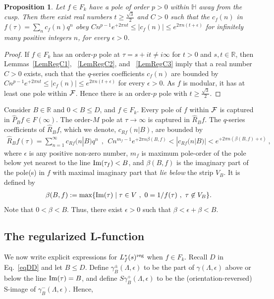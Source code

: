 \documentclass[11pt,a4paper]{article}
\newcommand{\g}{\gamma}
\newcommand{\e}{\epsilon}
\newcommand{\La}{\Lambda}
\newcommand{\Fu}{{\cal F}}
\newtheorem{prop}[thm]{Proposition}
\def\R{\mathbb{R}}
\newcommand{\HH}{{\mathbb H}}				%
\newcommand{\reg}{{\rm reg}}
\newcommand{\PF}{\widehat{P}} 				%
\newcommand{\RF}{\widehat{R}} 				%
\begin{document}
\begin{prop}
\label{PropGrowthCap}
Let $f \in F_k$ have a pole of order $p > 0$ within $\HH$ away from the cusp. Then there exist real numbers $t \geq \tfrac{\sqrt{3}}{2}$ and $C > 0$ such that the $c_f(n)$ in
$f(\tau) = \sum_n c_f(n) q^n$ obey $C n^{p-1} e^{+2 \pi n t} \leq |c_f(n)| \leq e^{2 \pi n (t+\e)}$ for infinitely many positive integers $n$, for every $\e > 0$.
\end{prop}

\begin{proof}
If $f \in F_k$ has an order-$p$ pole at $\tau = s + i t\neq i \infty$ for $t>0$ and $s,t \in \R$, then Lemmas~\ref{LemRegC1}, ~\ref{LemRegC2}, and ~\ref{LemRegC3} imply that a real number $C > 0$ exists, such that the $q$-series coefficients $c_f(n)$ are bounded by $C n^{p-1} e^{+2 \pi n t} \leq |c_f(n)| \leq e^{2 \pi n (t+\e)}$ for every $\e > 0$. As $f$ is modular, it has at least one pole within ${\cal F}$. Hence there is an order-$p$ pole with $t \geq \tfrac{\sqrt{3}}{2}$. 
\end{proof}

Consider $B \in \R$ and $0 < B \leq D$, and $f \in F_k$. Every pole of $f$ within $\Fu$ is captured in $\PF_B f \in F(\infty)$. The order-$M$ pole at $\tau \to \infty$ is captured in $\RF_B f$. The $q$-series coefficients of $\RF_B f$, which we denote, $c_{Rf}(n|B)$, are bounded by 
\begin{align}
\RF_B f(\tau) = \sum_{n = 1}^{\infty} c_{Rf}(n|B) q^n~~,~~C n^{m_f -1} e^{+2 \pi n \beta(B,f)}< |c_{Rf}(n|B)|  < e^{+2 \pi n (\beta(B,f) + \e)} ~, \label{eqCtilde}
\end{align}
where $\e$ is any positive non-zero number, $m_f$ is maximum pole-order of the pole below yet nearest to the line ${\rm Im}(\tau_f) < B$, and $\beta(B,f)$ is the imaginary part of the pole(s) in $f$ with maximal imaginary part that {\em lie below} the strip $V_B$. It is defined by
\begin{align}
\beta(B,f) := {\rm max}\{ {\rm Im}(\tau) \mid \tau \in V~,~ 0 = 1/f(\tau) ~,~\tau \not\in V_B \} .\label{eqBetaData}
\end{align}
Note that $0 < \beta < B$. Thus, there exist $\e>0$ such that $\beta < \e+\beta < B$. 

\subsection{The regularized L-function}\label{secSeriesL}

We now write explicit expressions for $L_f^*(s)^\reg$ when $f \in F_k$. Recall $D$ in Eq.~\eqref{eqDD} and let $B \leq D$. Define $\g_B^{\pm}(\La,\e)$ to be the part of $\g(\La,\e)$ above or below the line ${\rm Im}(\tau) = B$, and define $S\g_B^{+}(\La,\e)$ to be the (orientation-reversed) S-image of $\g_B^{-}(\La,\e)$. Hence,
\end{document}
